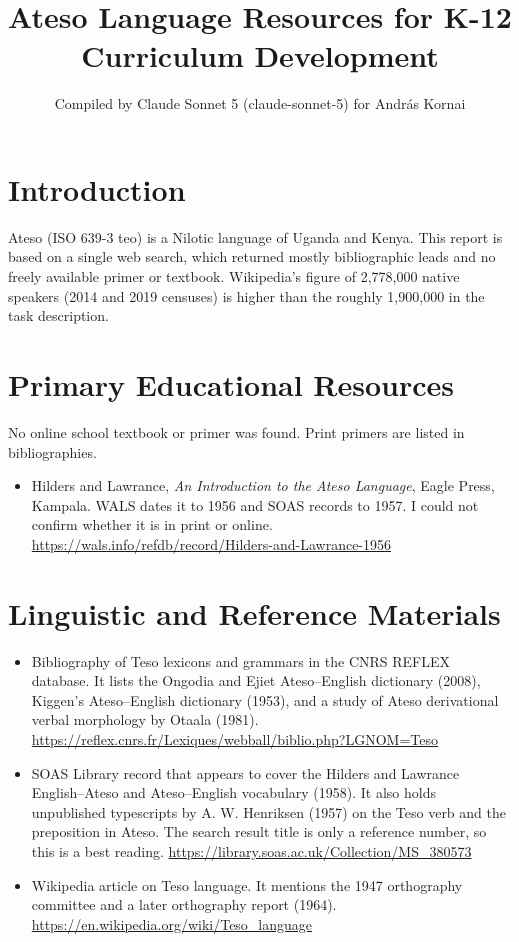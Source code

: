 \documentclass[12pt]{article}
\title{Ateso Language Resources for K-12 Curriculum Development}
\author{Compiled by Claude Sonnet 5 (claude-sonnet-5) for Andr\'as Kornai}
\date{}
\begin{document}
\maketitle

\section{Introduction}
Ateso (ISO 639-3 teo) is a Nilotic language of Uganda and Kenya. This report is based on a single web search, which returned mostly bibliographic leads and no freely available primer or textbook. Wikipedia's figure of 2,778,000 native speakers (2014 and 2019 censuses) is higher than the roughly 1,900,000 in the task description.

\section{Primary Educational Resources}
No online school textbook or primer was found. Print primers are listed in bibliographies.
\begin{itemize}
\item Hilders and Lawrance, \emph{An Introduction to the Ateso Language}, Eagle Press, Kampala. WALS dates it to 1956 and SOAS records to 1957. I could not confirm whether it is in print or online. \url{https://wals.info/refdb/record/Hilders-and-Lawrance-1956}
\end{itemize}

\section{Linguistic and Reference Materials}
\begin{itemize}
\item Bibliography of Teso lexicons and grammars in the CNRS REFLEX database. It lists the Ongodia and Ejiet Ateso--English dictionary (2008), Kiggen's Ateso--English dictionary (1953), and a study of Ateso derivational verbal morphology by Otaala (1981). \url{https://reflex.cnrs.fr/Lexiques/webball/biblio.php?LGNOM=Teso}
\item SOAS Library record that appears to cover the Hilders and Lawrance English--Ateso and Ateso--English vocabulary (1958). It also holds unpublished typescripts by A. W. Henriksen (1957) on the Teso verb and the preposition in Ateso. The search result title is only a reference number, so this is a best reading. \url{https://library.soas.ac.uk/Collection/MS_380573}
\item Wikipedia article on Teso language. It mentions the 1947 orthography committee and a later orthography report (1964). \url{https://en.wikipedia.org/wiki/Teso_language}
\end{itemize}
\end{document}

